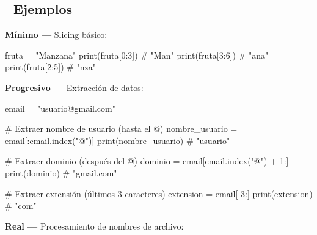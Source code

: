\documentclass[
  doc,
  floatsintext,
  longtable,
  a4paper,
  nolmodern,
  notxfonts,
  notimes,
  12pt,
  colorlinks=true,linkcolor=blue,citecolor=blue,urlcolor=blue]{apa7}
\newenvironment{Shaded}{\begin{snugshade}}{\end{snugshade}}
\newcommand{\BuiltInTok}[1]{\textcolor[rgb]{0.00,0.23,0.31}{#1}}
\newcommand{\CommentTok}[1]{\textcolor[rgb]{0.37,0.37,0.37}{#1}}
\newcommand{\DecValTok}[1]{\textcolor[rgb]{0.68,0.00,0.00}{#1}}
\newcommand{\NormalTok}[1]{\textcolor[rgb]{0.00,0.23,0.31}{#1}}
\newcommand{\OperatorTok}[1]{\textcolor[rgb]{0.37,0.37,0.37}{#1}}
\newcommand{\StringTok}[1]{\textcolor[rgb]{0.13,0.47,0.30}{#1}}
\begin{document}
\subsection{🔬 Ejemplos}\label{ejemplos}

\textbf{Mínimo ---} Slicing básico:

\begin{Shaded}
\begin{Highlighting}[]
\NormalTok{fruta }\OperatorTok{=} \StringTok{"Manzana"}
\BuiltInTok{print}\NormalTok{(fruta[}\DecValTok{0}\NormalTok{:}\DecValTok{3}\NormalTok{])  }\CommentTok{\# "Man"}
\BuiltInTok{print}\NormalTok{(fruta[}\DecValTok{3}\NormalTok{:}\DecValTok{6}\NormalTok{])  }\CommentTok{\# "ana"}
\BuiltInTok{print}\NormalTok{(fruta[}\DecValTok{2}\NormalTok{:}\DecValTok{5}\NormalTok{])  }\CommentTok{\# "nza"}
\end{Highlighting}
\end{Shaded}

\textbf{Progresivo ---} Extracción de datos:

\begin{Shaded}
\begin{Highlighting}[]
\NormalTok{email }\OperatorTok{=} \StringTok{"usuario@gmail.com"}

\CommentTok{\# Extraer nombre de usuario (hasta el @)}
\NormalTok{nombre\_usuario }\OperatorTok{=}\NormalTok{ email[:email.index(}\StringTok{"@"}\NormalTok{)]}
\BuiltInTok{print}\NormalTok{(nombre\_usuario)  }\CommentTok{\# "usuario"}

\CommentTok{\# Extraer dominio (después del @)}
\NormalTok{dominio }\OperatorTok{=}\NormalTok{ email[email.index(}\StringTok{"@"}\NormalTok{) }\OperatorTok{+} \DecValTok{1}\NormalTok{:]}
\BuiltInTok{print}\NormalTok{(dominio)  }\CommentTok{\# "gmail.com"}

\CommentTok{\# Extraer extensión (últimos 3 caracteres)}
\NormalTok{extension }\OperatorTok{=}\NormalTok{ email[}\OperatorTok{{-}}\DecValTok{3}\NormalTok{:]}
\BuiltInTok{print}\NormalTok{(extension)  }\CommentTok{\# "com"}
\end{Highlighting}
\end{Shaded}

\textbf{Real ---} Procesamiento de nombres de archivo:
\end{document}
